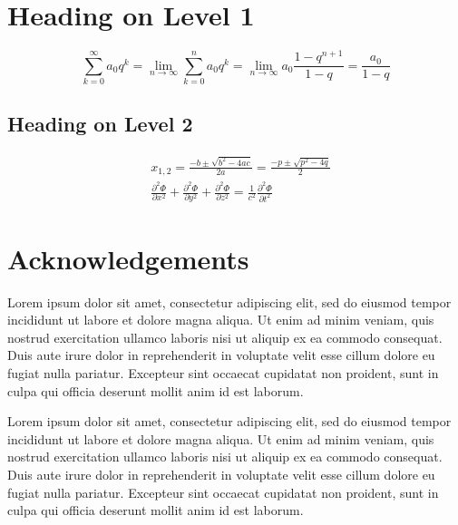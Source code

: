 \documentclass{cup-elements}
\begin{document}
\section{Heading on Level 1}

\blindtext
\begin{equation}
\sum_{k=0}^\infty a_0q^k = \lim_{n\to\infty}\sum_{k=0}^n a_0q^k =
  \lim_{n\to\infty} a_0\frac{1-q^{n+1}}{1-q} = \frac{a_0}{1-q}
\end{equation}

\blindtext\blindtext

\subsection{Heading on Level 2}

\blindtext
\begin{align}
& x_{1,2}=\frac{-b \pm \sqrt{b^2-4ac}}{2a} = \frac{-p \pm \sqrt{p^2-4q}}{2}\\
& \frac{\partial^2 \Phi}{\partial x^2} + \frac{\partial^2 \Phi}{\partial y^2} +
  \frac{\partial^2 \Phi}{\partial z^2} =
  \frac{1}{c^2}\frac{\partial^2\Phi}{\partial t^2}
\end{align}

\Blindtext



\section*{Acknowledgements}

Lorem ipsum dolor sit amet, consectetur adipiscing elit, sed do eiusmod tempor incididunt ut labore et dolore magna aliqua. Ut enim ad minim veniam, quis nostrud exercitation ullamco laboris nisi ut aliquip ex ea commodo consequat. Duis aute irure dolor in reprehenderit in voluptate velit esse cillum dolore eu fugiat nulla pariatur. Excepteur sint occaecat cupidatat non proident, sunt in culpa qui officia deserunt mollit anim id est laborum.

Lorem ipsum dolor sit amet, consectetur adipiscing elit, sed do eiusmod tempor incididunt ut labore et dolore magna aliqua. Ut enim ad minim veniam, quis nostrud exercitation ullamco laboris nisi ut aliquip ex ea commodo consequat. Duis aute irure dolor in reprehenderit in voluptate velit esse cillum dolore eu fugiat nulla pariatur. Excepteur sint occaecat cupidatat non proident, sunt in culpa qui officia deserunt mollit anim id est laborum.
\end{document}
